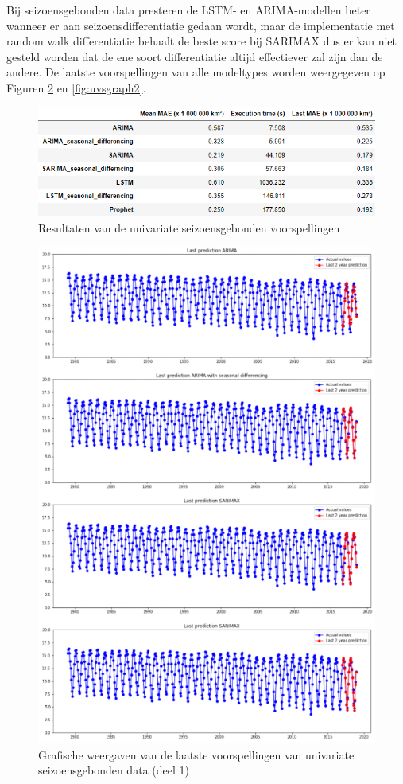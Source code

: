 Bij seizoensgebonden data presteren de LSTM- en ARIMA-modellen beter wanneer er aan seizoensdifferentiatie gedaan wordt, maar de implementatie met random walk differentiatie behaalt de beste score bij SARIMAX dus er kan niet gesteld worden dat de ene soort differentiatie altijd effectiever zal zijn dan de andere. De laatste voorspellingen van alle modeltypes worden weergegeven op Figuren \ref{fig:uvsgraph1} en \ref{fig:uvsgraph2}.


\begin{figure}[!h]
    \centering
    \caption{Resultaten van de univariate seizoensgebonden voorspellingen}
    \label{fig:uv_s_results}
    \includegraphics[width=0.9\linewidth]{uv_s_results}
\end{figure}

\begin{figure}[!h]
    \centering
    \caption{Grafische weergaven van de laatste voorspellingen van univariate seizoensgebonden data (deel 1)}
    \label{fig:uvsgraph1}
    \includegraphics[width=1\linewidth]{uv_s_graph1}
\end{figure}

